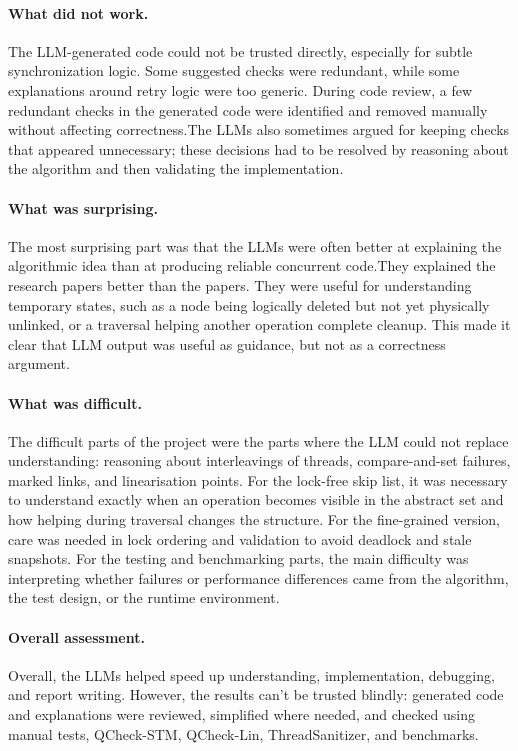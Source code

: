 \documentclass[11pt,a4paper]{article}
\begin{document}
\paragraph{What did not work.}
The LLM-generated code could not be trusted directly, especially for subtle synchronization logic. Some suggested checks were redundant, while some explanations around retry logic were too generic. During code review, a few redundant checks in the generated code were identified and removed manually without affecting correctness.The LLMs also sometimes argued for keeping checks that appeared unnecessary; these decisions had to be resolved by reasoning about the algorithm and then validating the implementation.

\paragraph{What was surprising.}
The most surprising part was that the LLMs were often better at explaining the algorithmic idea than at producing reliable concurrent code.They explained the research papers better than the papers. They were useful for understanding temporary states, such as a node being logically deleted but not yet physically unlinked, or a traversal helping another operation complete cleanup. This made it clear that LLM output was useful as guidance, but not as a correctness argument.

\paragraph{What was difficult.}
The difficult parts of the project were the parts where the LLM could not replace understanding: reasoning about interleavings of threads, compare-and-set failures, marked links, and linearisation points. For the lock-free skip list, it was necessary to understand exactly when an operation becomes visible in the abstract set and how helping during traversal changes the structure. For the fine-grained version, care was needed in lock ordering and validation to avoid deadlock and stale snapshots. For the testing and benchmarking parts, the main difficulty was interpreting whether failures or performance differences came from the algorithm, the test design, or the runtime environment.

\paragraph{Overall assessment.}
Overall, the LLMs helped speed up understanding, implementation, debugging, and report writing. However, the results can't be trusted blindly: generated code and explanations were reviewed, simplified where needed, and checked using manual tests, QCheck-STM, QCheck-Lin, ThreadSanitizer, and benchmarks.
\end{document}
